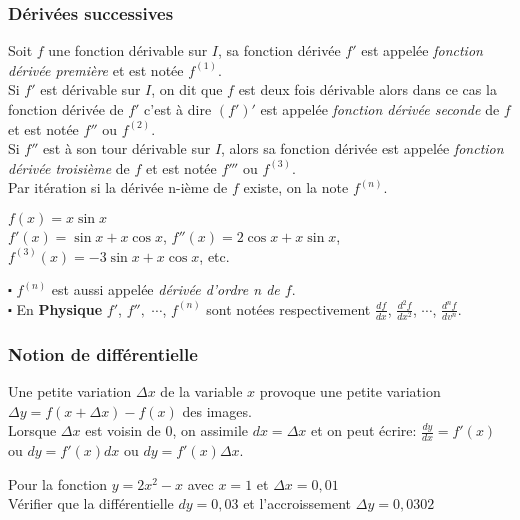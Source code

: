 \begin{example}
 \subsubsection*{Dérivées successives}

 \begin{definition}
 Soit $ f $ une fonction dérivable sur $ I $, sa fonction  dérivée $ f' $ est appelée                            
  \emph{fonction dérivée première} et est notée $ f^{(1)}.$ \\
 Si $ f'$ est dérivable sur $ I $, on dit que $ f $ est deux fois dérivable alors dans ce cas la fonction  dérivée  de $ f' $ c'est à dire $ (f')' $ est  appelée \emph{fonction dérivée seconde} de $ f $ et est notée $ f'' $ ou $ f^{(2)} .$ \\ 
  Si $ f''$  est à son tour  dérivable sur $ I $, alors sa fonction  dérivée   est  appelée \emph{fonction dérivée troisième} de $ f $ et est notée $ f''' $ ou $ f^{(3)} .$ \\ 
 Par itération si la dérivée n-ième de $ f $ existe, on la note $ f^{(n)} .$   
 \end{definition}
 
  \begin{example}
 $ f(x)= x\sin x $ \\
 $ f'(x)=\sin x+x\cos x $, $ f''(x)=2\cos x+x\sin x $, $ f^{(3)}(x)=-3\sin x+x\cos x $, etc.
  \end{example}
   \begin{remark}
 $ \centerdot $ $ f^{(n)}$ est aussi appelée \emph{dérivée d'ordre n de $ f. $} \\
  $ \centerdot $ En \textbf{\color{magenta}Physique} $f' $, $ f'', $ $\cdots$, $ f^{(n)}$ sont notées respectivement $\frac{df}{dx} $, $ \frac{d^{2}f}{dx^{2}} $, $\cdots$, $ \frac{d^{n}f}{dv^{n}}$.
 \end{remark}
\subsubsection*{Notion de différentielle}
Une petite variation $ \Delta x $ de la variable $ x $ provoque une petite variation  $ \Delta y = f(x+ \Delta x)-f(x) $ des images.\\ Lorsque $ \Delta x $ est voisin de $ 0 $, on assimile $ dx=\Delta x $ et on peut écrire: $ \frac{dy}{dx} =f'(x)$ ou $ dy=f'(x)dx $ ou $ dy=f'(x)\Delta x $.
\begin{example}
 Pour la fonction $ y=2x^2-x $ avec $x=1 $  et $\Delta x= 0,01 $ \\ Vérifier que la différentielle $dy=0,03  $ et l'accroissement $ \Delta y= 0,0302 $
\end{example}

\end{example}
